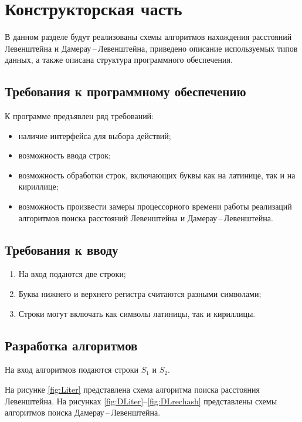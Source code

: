 \chapter{Конструкторская часть}

В данном разделе будут реализованы схемы алгоритмов нахождения расстояний Левенштейна и Дамерау\,--\,Левенштейна, приведено описание используемых типов данных, а также описана структура программного обеспечения.

\section{Требования к программному обеспечению}\label{section:requirements_1}
К программе предъявлен ряд требований:
\begin{itemize}[label=---]
	\item наличие интерфейса для выбора действий;
	\item возможность ввода строк;
	\item возможность обработки строк, включающих буквы как на латинице, так и на кириллице;
	\item возможность произвести замеры процессорного времени работы реализаций алгоритмов поиска расстояний Левенштейна и Дамерау\,--\,Левенштейна.
\end{itemize}

\section{Требования к вводу}\label{section:requirements_2}
\begin{enumerate}
    \item На вход подаются две строки;
    \item Буква нижнего и верхнего регистра считаются разными символами;
    \item Строки могут включать как символы латиницы, так и кириллицы.
\end{enumerate}

\section{Разработка алгоритмов}

На вход алгоритмов подаются строки $S_1$ и $S_2$.

На рисунке \ref{fig:Liter} представлена схема алгоритма поиска расстояния Левенштейна.
На рисунках \ref{fig:DLiter}--\ref{fig:DLrechash} представлены схемы алгоритмов поиска Дамерау\,--\,Левенштейна.

